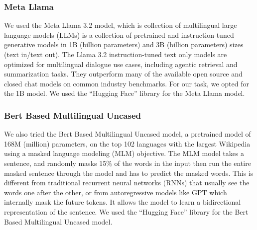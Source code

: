 \subsubsection{Meta Llama}
We used the Meta Llama 3.2 model, which is collection of multilingual large language models (LLMs) is a collection of pretrained and instruction-tuned generative models in 1B (billion parameters) and 3B (billion parameters) sizes (text in/text out). The Llama 3.2 instruction-tuned text only models are optimized for multilingual dialogue use cases, including agentic retrieval and summarization tasks. They outperform many of the available open source and closed chat models on common industry benchmarks. For our task, we opted for the 1B model. We used the ``Hugging Face'' library for the Meta Llama model. 

\subsubsection{Bert Based Multilingual Uncased}
We also tried the Bert Based Multilingual Uncased model, a pretrained model of 168M (million) parameters, on the top 102 languages with the largest Wikipedia using a masked language modeling (MLM) objective. The MLM model takes a sentence, and randomly masks 15\% of the words in the input then run the entire masked sentence through the model and has to predict the masked words. This is different from traditional recurrent neural networks (RNNs) that usually see the words one after the other, or from autoregressive models like GPT which internally mask the future tokens. It allows the model to learn a bidirectional representation of the sentence. We used the ``Hugging Face'' library for the Bert Based Multilingual Uncased model.